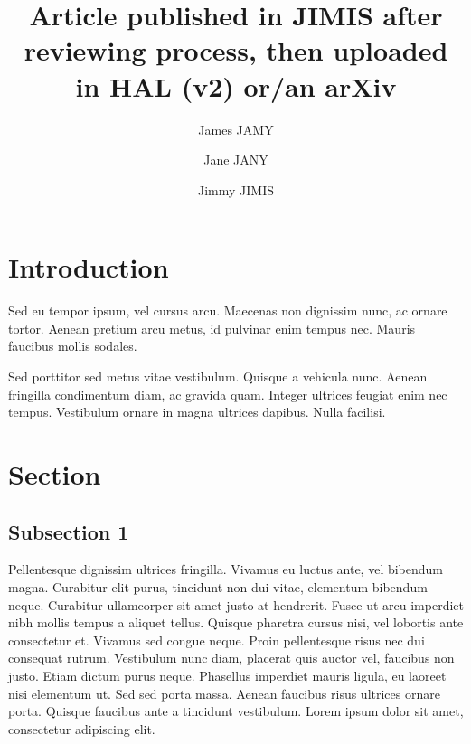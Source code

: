 \documentclass{jimis-final-en}
\title{Article published in JIMIS after reviewing process, then uploaded in HAL (v2) or/an arXiv}
\author[1]{James JAMY}
\author[2]{Jane JANY}
\author[*1,2]{Jimmy JIMIS}
\affil[1]{University One, Country A}
\affil[2]{University Two, Country B}
\begin{document}
\maketitle



\section{Introduction}

\strut
\vspace{-4ex}

Sed eu tempor ipsum, vel cursus arcu. Maecenas non dignissim nunc, ac ornare tortor. Aenean
pretium arcu metus, id pulvinar enim tempus nec. Mauris faucibus mollis sodales. 

Sed porttitor sed metus vitae vestibulum. Quisque a vehicula nunc. Aenean fringilla condimentum
diam, ac gravida quam. Integer ultrices feugiat enim nec tempus. Vestibulum ornare in magna
ultrices dapibus. Nulla facilisi. 

\section{Section}

\subsection{Subsection 1}
Pellentesque dignissim ultrices fringilla. Vivamus eu luctus ante, vel bibendum magna.
Curabitur elit purus, tincidunt non dui vitae, elementum bibendum neque. Curabitur
ullamcorper sit amet justo at hendrerit. Fusce ut arcu imperdiet nibh mollis tempus a aliquet
tellus. Quisque pharetra cursus nisi, vel lobortis ante consectetur et. Vivamus sed congue
neque. Proin pellentesque risus nec dui consequat rutrum. Vestibulum nunc diam, placerat
quis auctor vel, faucibus non justo. Etiam dictum purus neque. Phasellus imperdiet mauris
ligula, eu laoreet nisi elementum ut. Sed sed porta massa. Aenean faucibus risus ultrices
ornare porta. Quisque faucibus ante a tincidunt vestibulum. Lorem ipsum dolor sit amet,
consectetur adipiscing elit.
\end{document}
